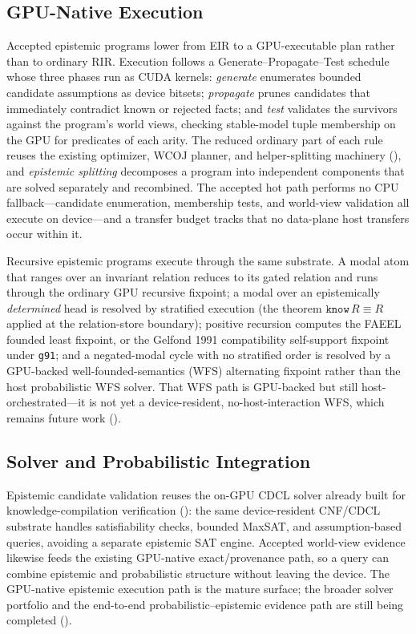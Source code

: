 \subsection{GPU-Native Execution}\label{subsec:epistemic-gpu}

Accepted epistemic programs lower from EIR to a GPU-executable plan rather than to ordinary RIR. Execution follows a Generate--Propagate--Test schedule whose three phases run as CUDA kernels: \emph{generate} enumerates bounded candidate assumptions as device bitsets; \emph{propagate} prunes candidates that immediately contradict known or rejected facts; and \emph{test} validates the survivors against the program's world views, checking stable-model tuple membership on the GPU for predicates of each arity. The reduced ordinary part of each rule reuses the existing optimizer, WCOJ planner, and helper-splitting machinery (), and \emph{epistemic splitting} decomposes a program into independent components that are solved separately and recombined. The accepted hot path performs no CPU fallback---candidate enumeration, membership tests, and world-view validation all execute on device---and a transfer budget tracks that no data-plane host transfers occur within it.

Recursive epistemic programs execute through the same substrate. A modal atom that ranges over an invariant relation reduces to its gated relation and runs through the ordinary GPU recursive fixpoint; a modal over an epistemically \emph{determined} head is resolved by stratified execution (the theorem \(\texttt{know}\,R \equiv R\) applied at the relation-store boundary); positive recursion computes the FAEEL founded least fixpoint, or the Gelfond 1991 compatibility self-support fixpoint under \texttt{g91}; and a negated-modal cycle with no stratified order is resolved by a GPU-backed well-founded-semantics (WFS) alternating fixpoint rather than the host probabilistic WFS solver. That WFS path is GPU-backed but still host-orchestrated---it is not yet a device-resident, no-host-interaction WFS, which remains future work ().

\subsection{Solver and Probabilistic Integration}

Epistemic candidate validation reuses the on-GPU CDCL solver already built for knowledge-compilation verification (): the same device-resident CNF/CDCL substrate handles satisfiability checks, bounded MaxSAT, and assumption-based queries, avoiding a separate epistemic SAT engine. Accepted world-view evidence likewise feeds the existing GPU-native exact/provenance path, so a query can combine epistemic and probabilistic structure without leaving the device. The GPU-native epistemic execution path is the mature surface; the broader solver portfolio and the end-to-end probabilistic--epistemic evidence path are still being completed ().
